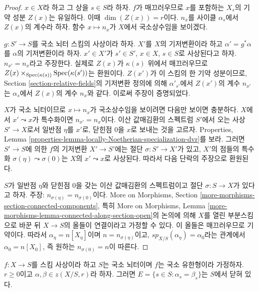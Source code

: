 \begin{proof}
$x \in X$라 하고 그 상을 $s \in S$라 하자. $f$가 매끄러우므로
$x$를 포함하는 $X_s$의 기약 성분 $Z(x)$는 유일하다. 이때
$\dim(Z(x)) = r$이다. $n_x$를 사이클 $\alpha_s$에서 $Z(x)$의
계수라 하자. 함수 $x \mapsto n_x$가 $X$에서 국소상수임을 보이겠다.

\medskip\noindent
$g : S' \to S$를 국소 뇌터 스킴의 사상이라 하자. $X'$를 $X$의
기저변환이라 하고 $\alpha' = g^*\alpha$를 $\alpha$의 기저변환이라
하자. $x' \in X'$가 $s' \in S'$, $x \in X$, $s \in S$로 사상된다고
하자. $n_{x'} = n_x$라고 주장한다. 실제로 $Z(x)$가
$\kappa(s)$ 위에서 매끄러우므로
$Z(x) \times_{\mathop{\mathrm{Spec}}(\kappa(s))} \mathop{\mathrm{Spec}}(\kappa(s'))$는 환원이다.
$Z(x')$가 이 스킴의 한 기약 성분이므로, Section
\ref{section-relative-fields}의 기저변환 정의에 의해
$\alpha'_{s'}$에서 $Z(x')$의 계수 $n_{x'}$는 $\alpha_s$에서
$Z(x)$의 계수 $n_x$와 같다. 이로써 주장이 증명되었다.

\medskip\noindent
$X$가 국소 뇌터이므로 $x \mapsto n_x$가 국소상수임을 보이려면
다음만 보이면 충분하다. $X$에서 $x' \leadsto x$가 특수화이면
$n_{x'} = n_x$이다. 이산 값매김환의 스펙트럼 $S'$에서 오는 사상
$S' \to X$로서 일반점 $\eta$를 $x'$로, 닫힌점 $0$을 $x$로 보내는
것을 고르자. Properties, Lemma
\ref{properties-lemma-locally-Noetherian-specialization-dvr}를 보라.
그러면 $S' \to S$에 의한 $f$의 기저변환 $X' \to S'$에는 절단
$\sigma : S' \to X'$가 있고, $X'$의 점들의 특수화
$\sigma(\eta) \leadsto \sigma(0)$는 $X$의 $x' \leadsto x$로 사상된다.
따라서 다음 단락의 주장으로 환원된다.

\medskip\noindent
$S$가 일반점 $\eta$와 닫힌점 $0$을 갖는 이산 값매김환의
스펙트럼이고 절단 $\sigma : S  \to X$가 있다고 하자. 주장:
$n_{\sigma(\eta)} = n_{\sigma(0)}$이다. More on Morphisms, Section
\ref{more-morphisms-section-connected-components}, 특히 More on Morphisms,
Lemma \ref{more-morphisms-lemma-connected-along-section-open}의 논의에
의해 $X$를 열린 부분스킴으로 바꾼 뒤 $X \to S$의 올들이 연결이라고
가정할 수 있다. 이 올들은 매끄러우므로 기약이다. 따라서
$\alpha_\eta = n[X_\eta]$이며 $n = n_{\sigma(\eta)}$이고,
$sp_{X/S}(\alpha_\eta) = \alpha_0$라는 관계에서
$\alpha_0 = n[X_0]$, 즉 원하는 $n_{\sigma(0)} = n$이 따른다.
\end{proof}

\begin{lemma}
\label{lemma-relative-cycles-equal}
$f : X \to S$를 스킴 사상이라 하고 $S$는 국소 뇌터이며 $f$는
국소 유한형이라 가정하자. $r \geq 0$이고
$\alpha, \beta \in z(X/S, r)$라 하자. 그러면
$E = \{s \in S : \alpha_s = \beta_s\}$는 $S$에서 닫혀 있다.
\end{lemma}

